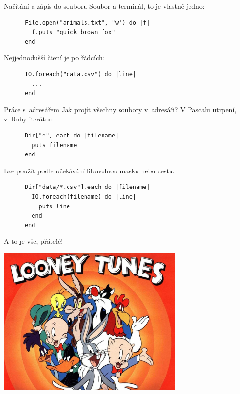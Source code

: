 \documentclass{beamer}
\begin{document}
\begin{frame}[fragile]{Načítání a zápis do souboru}
  Soubor a terminál, to je vlastně jedno:
  \begin{block}{}
    {\scriptsize \begin{verbatim}
      File.open("animals.txt", "w") do |f|
        f.puts "quick brown fox"
      end
    \end{verbatim}}
  \end{block}
  \pause
  Nejjednodušší čtení je po řádcích:
  \begin{block}{}
    {\scriptsize \begin{verbatim}
      IO.foreach("data.csv") do |line|
        ...
      end
    \end{verbatim}}
  \end{block}
\end{frame}

\begin{frame}[fragile]{Práce s~adresářem}
  Jak projít všechny soubory v~adresáři? V Pascalu utrpení, v~Ruby iterátor:
  \begin{block}{}
    {\scriptsize \begin{verbatim}
      Dir["*"].each do |filename|
        puts filename
      end
    \end{verbatim}}
  \end{block}
  \pause
  Lze použít podle očekávání libovolnou masku nebo cestu:
  \begin{block}{}
    {\scriptsize \begin{verbatim}
      Dir["data/*.csv"].each do |filename|
        IO.foreach(filename) do |line|
          puts line
        end
      end
    \end{verbatim}}
  \end{block}
\end{frame}

\begin{frame}{A to je vše, přátelé!}
  \begin{center}
    \includegraphics[width=0.7\textwidth]{looney_tunes}
  \end{center}
\end{frame}
\end{document}
